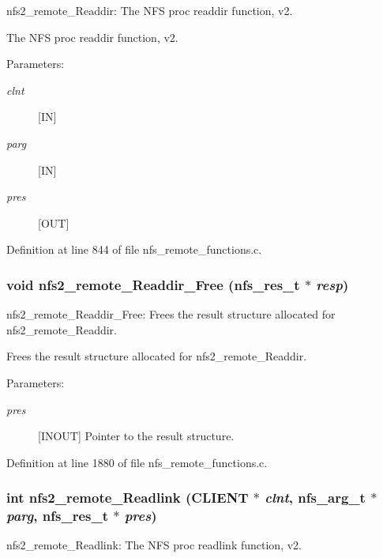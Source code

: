 nfs2\_\-remote\_\-Readdir: The NFS proc readdir function, v2.

The NFS proc readdir function, v2.

\begin{Desc}
\item[Parameters:]
\begin{description}
\item[{\em clnt}][IN] \item[{\em parg}][IN] \item[{\em pres}][OUT] \end{description}
\end{Desc}


Definition at line 844 of file nfs\_\-remote\_\-functions.c.
\subsubsection{\setlength{\rightskip}{0pt plus 5cm}void nfs2\_\-remote\_\-Readdir\_\-Free (nfs\_\-res\_\-t $\ast$ {\em resp})}\label{group__NFSprocs_ga70}


nfs2\_\-remote\_\-Readdir\_\-Free: Frees the result structure allocated for nfs2\_\-remote\_\-Readdir.

Frees the result structure allocated for nfs2\_\-remote\_\-Readdir.

\begin{Desc}
\item[Parameters:]
\begin{description}
\item[{\em pres}][INOUT] Pointer to the result structure. \end{description}
\end{Desc}


Definition at line 1880 of file nfs\_\-remote\_\-functions.c.
\subsubsection{\setlength{\rightskip}{0pt plus 5cm}int nfs2\_\-remote\_\-Readlink (CLIENT $\ast$ {\em clnt}, nfs\_\-arg\_\-t $\ast$ {\em parg}, nfs\_\-res\_\-t $\ast$ {\em pres})}\label{group__NFSprocs_ga5}


nfs2\_\-remote\_\-Readlink: The NFS proc readlink function, v2.

